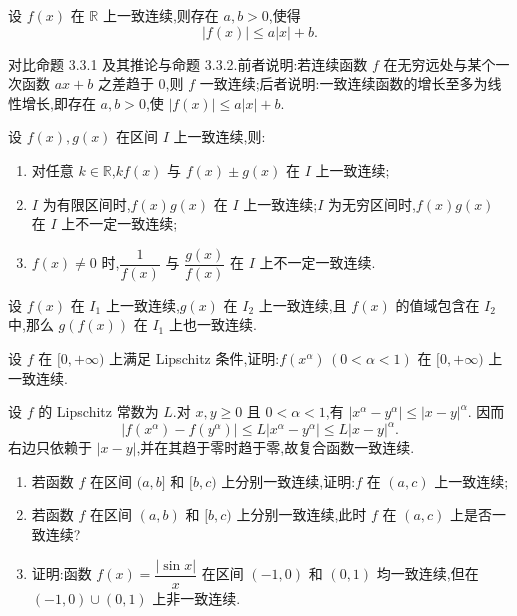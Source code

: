 \begin{proposition}
    设 $f(x)$ 在 $\mathbb{R}$ 上一致连续,则存在 $a,b>0$,使得
    \[
        |f(x)|\leq a|x|+b.
    \]
\end{proposition}

\begin{remark}
    对比命题 3.3.1 及其推论与命题 3.3.2.前者说明:若连续函数 $f$ 在无穷远处与某个一次函数 $ax+b$ 之差趋于 $0$,则 $f$ 一致连续;后者说明:一致连续函数的增长至多为线性增长,即存在 $a,b>0$,使 $|f(x)|\leq a|x|+b$.
\end{remark}

\begin{proposition}
    设 $f(x),g(x)$ 在区间 $I$ 上一致连续,则:
    \begin{enumerate}
        \item 对任意 $k\in\mathbb{R}$,$kf(x)$ 与 $f(x)\pm g(x)$ 在 $I$ 上一致连续;
        \item $I$ 为有限区间时,$f(x)g(x)$ 在 $I$ 上一致连续;$I$ 为无穷区间时,$f(x)g(x)$ 在 $I$ 上不一定一致连续;
        \item $f(x)\neq0$ 时,$\dfrac{1}{f(x)}$ 与 $\dfrac{g(x)}{f(x)}$ 在 $I$ 上不一定一致连续.
    \end{enumerate}
\end{proposition}

\begin{proposition}
    设 $f(x)$ 在 $I_1$ 上一致连续,$g(x)$ 在 $I_2$ 上一致连续,且 $f(x)$ 的值域包含在 $I_2$ 中,那么 $g(f(x))$ 在 $I_1$ 上也一致连续.
\end{proposition}

\begin{example}
    设 $f$ 在 $\lbrack 0,+\infty)$ 上满足 Lipschitz 条件,证明:$f(x^\alpha)\,(0<\alpha<1)$ 在 $\lbrack 0,+\infty)$ 上一致连续.
\end{example}
\exampleblank

\begin{solution}
    设 $f$ 的 Lipschitz 常数为 $L$.对 $x,y\geq0$ 且 $0<\alpha<1$,有 $|x^\alpha-y^\alpha|\leq|x-y|^\alpha$.
    因而
    \[
        |f(x^\alpha)-f(y^\alpha)|\leq L|x^\alpha-y^\alpha| \leq L|x-y|^\alpha.
    \]
    右边只依赖于 $|x-y|$,并在其趋于零时趋于零,故复合函数一致连续.
\end{solution}

\begin{example}[区间合并]
    \begin{enumerate}
        \item 若函数 $f$ 在区间 $(a,b\rbrack$ 和 $\lbrack b,c)$ 上分别一致连续,证明:$f$ 在 $(a,c)$ 上一致连续;
        \item 若函数 $f$ 在区间 $(a,b)$ 和 $\lbrack b,c)$ 上分别一致连续,此时 $f$ 在 $(a,c)$ 上是否一致连续?
        \item 证明:函数 $f(x)=\dfrac{|\sin x|}{x}$ 在区间 $(-1,0)$ 和 $(0,1)$ 均一致连续,但在 $(-1,0)\cup(0,1)$ 上非一致连续.
    \end{enumerate}
\end{example}
\exampleblank

